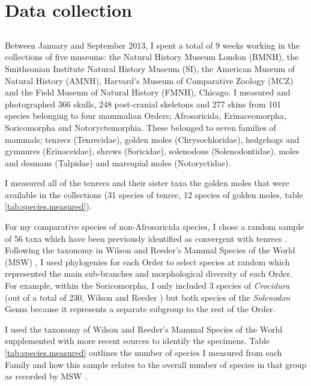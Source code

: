 \section{Data collection}
\label{sect:datacollection}


\subsection{}

	Between January and September 2013, I spent a total of 9 weeks working in the collections of five museums: the Natural History Museum London (BMNH), the Smithsonian Institute Natural History Museum (SI), the American Museum of Natural History (AMNH), Harvard's Museum of Comparative Zoology (MCZ) and the Field Museum of Natural History (FMNH), Chicago. I measured and photographed 366 skulls, 248 post-cranial skeletons and 277 skins from 101 species belonging to four mammalian Orders; Afrosoricida, Erinaceomorpha, Soricomorpha and Notoryctemorphia. 
	These belonged to seven families of mammals; tenrecs (Tenrecidae), golden moles (Chrysochloridae), hedgehogs and gymnures (Erinaceidae), shrews (Soricidae), solenodons (Solenodontidae), moles and desmans (Talpidae) and marsupial moles (Notoryctidae).

	I measured all of the tenrecs and their sister taxa the golden moles that were available in the collections (31 species of tenrec, 12 species of golden moles, table \ref{tab:species.measured}).
	
	For my comparative species of non-Afrosoricida species, I chose a random sample of 56 taxa 
	which have been previously identified as convergent with tenrecs \citep[e.g.][]{Gould1966, Symonds2005, Poux2008, Olson2013}. Following the taxonomy in Wilson and Reeder's Mammal Species of the World (MSW) \citeyearpar{Wilson2005}, I used phylogenies for each Order to select species at random which represented the main sub-branches and morphological diversity of each Order. For example, within the Soricomorpha, I only included 3 %
	species of \textit{Crocidura} (out of a total of 230, Wilson and Reeder \citeyear{Wilson2005}) but both species of the \textit{Solenodon} Genus because it represents a separate subgroup to the rest of the Order. 

	I used the taxonomy of Wilson and Reeder's Mammal Species of the World \citeyearpar[MSW,][]{Wilson2005} supplemented with more recent sources \citep[e.g.][]{Olson2013, Soarimalala2011} to identify the specimens. Table \ref{tab:species.measured} outlines the number of species I measured from each Family and how this sample relates to the overall number of species in that group as recorded by MSW \citeyearpar{Wilson2005}.

